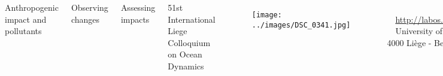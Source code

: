 \documentclass[final,table,14pt,svgnames]{beamer}
\begin{document}
\begin{frame}[fragile, t]
\begin{columns}
\begin{tcolorbox}
Anthropogenic impact and pollutants
\end{tcolorbox}

\vspace{.25cm}

\begin{tcolorbox}
Observing changes
\end{tcolorbox}

\vspace{.25cm}

\begin{tcolorbox}
Assessing impacts
\end{tcolorbox}

\column{0.5\paperwidth}
\centering

\vspace*{.1cm}
\footnotesize 51st International Liege Colloquium on Ocean Dynamics
\vspace*{.1cm}

\begin{figure}
\texttt{[image: ../images/DSC\_0341.jpg]}
\end{figure}

{\scriptsize
\textcolor{greygher}{{\faCalendarCheckO}~~\insertdate}\\
\textcolor{bluegher}{{\faHome}~~\url{http://labos.ulg.ac.be/gher/home/colloquium/}}\\
\textcolor{greygher}{{\faMapPin}~~University of Liège - Place du 20-Août, 7 - 4000 Liège - Belgium}\\
}


\column{0.22\paperwidth}
\centering
\scriptsize


\begin{tcolorbox}
Cryosphere-oceans\\ interaction
\end{tcolorbox}

\vspace{.25cm}

\begin{tcolorbox}
Paleo-oceanographic changes
\end{tcolorbox}

\vspace{.25cm}

\begin{tcolorbox}
Future changes
\end{tcolorbox}
   

\end{columns}
\end{frame}
\end{document}
